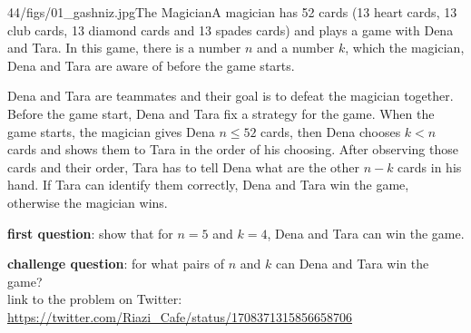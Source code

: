 \begin{problem}{44/figs/01_gashniz.jpg}{The Magician}A magician has 52 cards (13 heart cards, 13 club cards, 13 diamond cards and 13 spades cards) and plays a game with Dena and Tara. In this game, there is a number $n$ and a number $k$, which the magician, Dena and Tara are aware of before the game starts.

Dena and Tara are teammates and their goal is to defeat the magician together.
Before the game start, Dena and Tara fix a strategy for the game. When the game starts, the magician gives Dena $n \leq 52$ cards, then Dena chooses $k < n$ cards and shows them to Tara in the order of his choosing. After observing those cards and their order, Tara has to tell Dena what are the other $n-k$ cards in his hand. If Tara can identify them correctly, Dena and Tara win the game, otherwise the magician wins.

\textbf{first question}: show that for $n=5$ and $k=4$, Dena and Tara can win the game.

\textbf{challenge question}: for what pairs of $n$ and $k$ can Dena and Tara win the game?\\[0.2cm]

link to the problem on Twitter:  \url{https://twitter.com/Riazi_Cafe/status/1708371315856658706}\end{problem}